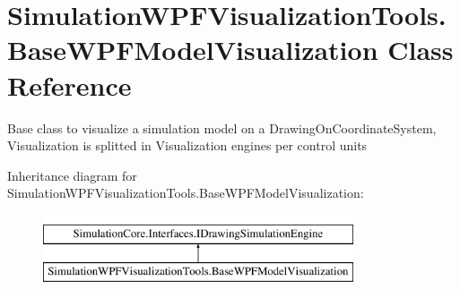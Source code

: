 \hypertarget{class_simulation_w_p_f_visualization_tools_1_1_base_w_p_f_model_visualization}{}\section{Simulation\+W\+P\+F\+Visualization\+Tools.\+Base\+W\+P\+F\+Model\+Visualization Class Reference}
\label{class_simulation_w_p_f_visualization_tools_1_1_base_w_p_f_model_visualization}


Base class to visualize a simulation model on a Drawing\+On\+Coordinate\+System, Visualization is splitted in Visualization engines per control units  


Inheritance diagram for Simulation\+W\+P\+F\+Visualization\+Tools.\+Base\+W\+P\+F\+Model\+Visualization\+:\begin{figure}[H]
\begin{center}
\leavevmode
\includegraphics[height=2.000000cm]{class_simulation_w_p_f_visualization_tools_1_1_base_w_p_f_model_visualization}
\end{center}
\end{figure}
